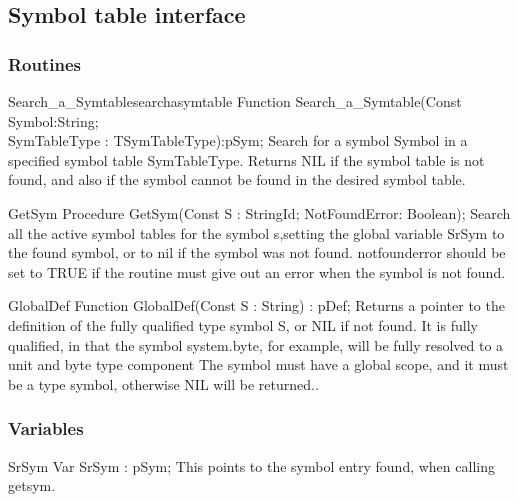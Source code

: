 \documentclass [a4paper,12pt]{article}
\begin{document}
\subsection{Symbol table interface}

\subsubsection{Routines}
\label{subsubsec:routinesable}

\begin{functionl}{Search{\_}a{\_}Symtable}{searchasymtable}
\Declaration
Function Search{\_}a{\_}Symtable(Const Symbol:String; \\
			SymTableType : TSymTableType):pSym;
\Description
Search for a symbol \textsf{Symbol} in a specified symbol table
\textsf{SymTableType}. Returns \textsf{NIL} if the symbol table is not
found, and also if the symbol cannot be found in the desired symbol table.
\end{functionl}

\begin{procedure}{GetSym}
\Declaration
Procedure GetSym(Const S : StringId; NotFoundError: Boolean);
\Description
Search all the active symbol tables for the symbol \textsf{s},setting the
global variable \textsf{SrSym} to the found symbol, or to \textsf{nil} if
the symbol was not found. \textsf{notfounderror} should be set to TRUE if
the routine must give out an error when the symbol is not found.
\end{procedure}

\begin{function}{GlobalDef}
\Declaration
Function GlobalDef(Const S : String) : pDef;
\Description
Returns a pointer to the definition of the fully qualified type symbol
\textsf{S}, or \textsf{NIL} if not found.
\Notes
It is fully qualified, in that the symbol \textsf{system.byte}, for example,
will be fully resolved to a unit and byte type component The symbol must
have a global scope, and it must be a type symbol, otherwise \textsf{NIL}
will be returned..
\end{function}

\subsubsection{Variables}
\label{subsubsec:variablesly}

\begin{variable}{SrSym}
\Declaration
Var SrSym : pSym;
\Description
This points to the symbol entry found, when calling \textsf{getsym}.
\end{variable}
\end{document}
